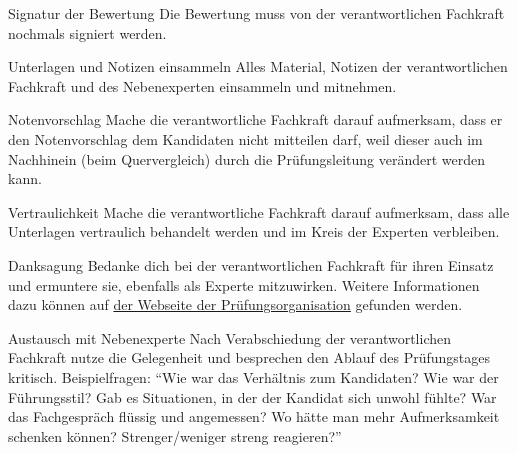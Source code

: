 \begin{taskitemwithoutcomment}{Signatur der Bewertung}
  Die Bewertung muss von der verantwortlichen Fachkraft nochmals signiert werden.
\end{taskitemwithoutcomment}
\begin{taskitemwithoutcomment}{Unterlagen und Notizen einsammeln}
  Alles Material, Notizen der verantwortlichen Fachkraft und des Nebenexperten einsammeln und mitnehmen.
\end{taskitemwithoutcomment}
\begin{taskitemwithoutcomment}{Notenvorschlag}
  Mache die verantwortliche Fachkraft darauf aufmerksam, dass er den Notenvorschlag dem Kandidaten nicht mitteilen darf, weil dieser auch im Nachhinein (beim Quervergleich) durch die Prüfungsleitung verändert werden kann.
\end{taskitemwithoutcomment}
\begin{taskitemwithoutcomment}{Vertraulichkeit}
  Mache die verantwortliche Fachkraft darauf aufmerksam, dass alle Unterlagen vertraulich behandelt werden und im Kreis der Experten verbleiben.
\end{taskitemwithoutcomment}
\begin{taskitemwithoutcomment}{Danksagung}
  Bedanke dich bei der verantwortlichen Fachkraft für ihren Einsatz und ermuntere sie, ebenfalls als Experte mitzuwirken. Weitere Informationen dazu können auf \href{https://pk19.ch}{der Webseite der Prüfungsorganisation} gefunden werden.
\end{taskitemwithoutcomment}
\begin{taskitem}{Austausch mit Nebenexperte}
  Nach Verabschiedung der verantwortlichen Fachkraft nutze die Gelegenheit und besprechen den Ablauf des Prüfungstages kritisch. Beispielfragen: \enquote{Wie war das Verhältnis zum Kandidaten? Wie war der Führungsstil? Gab es Situationen, in der der Kandidat sich unwohl fühlte? War das Fachgespräch flüssig und angemessen? Wo hätte man mehr Aufmerksamkeit schenken können? Strenger/weniger streng reagieren?}
\end{taskitem}
